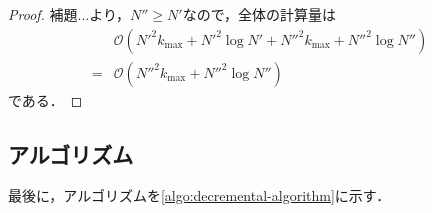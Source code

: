 \begin{proof}
  補題...より，$N''\geq N'$なので，全体の計算量は
  \begin{equation*}
    \begin{aligned}
      &\mathcal{O}(N'^2k_{\max}+N'^2\log N'+N''^2k_{\max}+N''^2\log N'')\\
      =&\mathcal{O}(N''^2k_{\max}+N''^2\log N'')
    \end{aligned}
  \end{equation*}
  である．
\end{proof}

\subsection{アルゴリズム}
\label{subsect:decremental-algorithm}
最後に，アルゴリズムを\ref{algo:decremental-algorithm}に示す．

